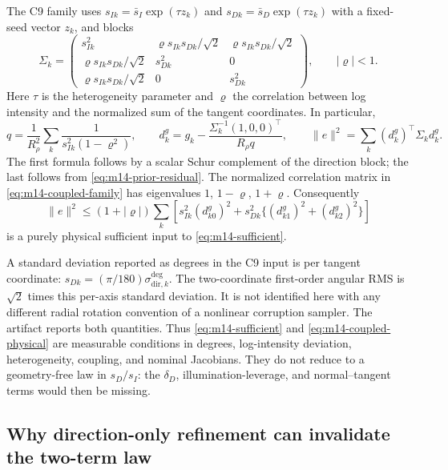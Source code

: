 The C9 family uses $s_{Ik}=\bar s_I\exp(\tau z_k)$ and
$s_{Dk}=\bar s_D\exp(\tau z_k)$ with a fixed-seed vector $z_k$, and blocks
\begin{equation}
 \Sigma_k=\begin{pmatrix}
 s_{Ik}^2 & \varrho s_{Ik}s_{Dk}/\sqrt2 & \varrho s_{Ik}s_{Dk}/\sqrt2\\
 \varrho s_{Ik}s_{Dk}/\sqrt2 &s_{Dk}^2&0\\
 \varrho s_{Ik}s_{Dk}/\sqrt2 &0&s_{Dk}^2
 \end{pmatrix},\qquad |\varrho|<1.
 \label{eq:m14-coupled-family}
\end{equation}
Here $\tau$ is the heterogeneity parameter and $\varrho$ the correlation
between log intensity and the normalized sum of the tangent coordinates.
In particular,
\begin{equation}
 q=\frac1{R_\rho^2}\sum_k\frac1{s_{Ik}^2(1-\varrho^2)},\qquad
 d_k^g=g_k-\frac{\Sigma_k^{-1}(1,0,0)^\top}{R_\rho q},\qquad
 \|e\|^2=\sum_k(d_k^g)^\top\Sigma_k d_k^g.
 \label{eq:m14-coupled-physical}
\end{equation}
The first formula follows by a scalar Schur complement of the direction
block; the last follows from \eqref{eq:m14-prior-residual}.  The normalized
correlation matrix in \eqref{eq:m14-coupled-family} has eigenvalues
$1$, $1-\varrho$, $1+\varrho$.  Consequently
\[
 \|e\|^2\leq(1+|\varrho|)\sum_k
 \left[s_{Ik}^2(d_{k0}^g)^2+s_{Dk}^2\{(d_{k1}^g)^2+(d_{k2}^g)^2\}\right]
\]
is a purely physical sufficient input to \eqref{eq:m14-sufficient}.

A standard deviation reported as degrees in the C9 input is per tangent
coordinate: $s_{Dk}=(\pi/180)\sigma_{\mathrm{dir},k}^{\mathrm{deg}}$.
The two-coordinate first-order angular RMS is $\sqrt2$ times this per-axis
standard deviation.  It is not identified here with any different radial
rotation convention of a nonlinear corruption sampler.  The artifact
reports both quantities.  Thus \eqref{eq:m14-sufficient} and
\eqref{eq:m14-coupled-physical} are measurable conditions in degrees,
log-intensity deviation, heterogeneity, coupling, and nominal Jacobians.
They do not reduce to a geometry-free law in $s_D/s_I$: the $\delta_D$,
illumination-leverage, and normal--tangent terms would then be missing.

\subsection{Why direction-only refinement can invalidate the two-term law}
\label{subsec:m14-direction}

